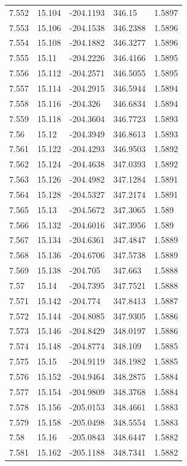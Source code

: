 \begin{tabular}{lllll}
7.552 & 15.104 & -204.1193 & 346.15 & 1.5897 \\
7.553 & 15.106 & -204.1538 & 346.2388 & 1.5896 \\
7.554 & 15.108 & -204.1882 & 346.3277 & 1.5896 \\
7.555 & 15.11 & -204.2226 & 346.4166 & 1.5895 \\
7.556 & 15.112 & -204.2571 & 346.5055 & 1.5895 \\
7.557 & 15.114 & -204.2915 & 346.5944 & 1.5894 \\
7.558 & 15.116 & -204.326 & 346.6834 & 1.5894 \\
7.559 & 15.118 & -204.3604 & 346.7723 & 1.5893 \\
7.56 & 15.12 & -204.3949 & 346.8613 & 1.5893 \\
7.561 & 15.122 & -204.4293 & 346.9503 & 1.5892 \\
7.562 & 15.124 & -204.4638 & 347.0393 & 1.5892 \\
7.563 & 15.126 & -204.4982 & 347.1284 & 1.5891 \\
7.564 & 15.128 & -204.5327 & 347.2174 & 1.5891 \\
7.565 & 15.13 & -204.5672 & 347.3065 & 1.589 \\
7.566 & 15.132 & -204.6016 & 347.3956 & 1.589 \\
7.567 & 15.134 & -204.6361 & 347.4847 & 1.5889 \\
7.568 & 15.136 & -204.6706 & 347.5738 & 1.5889 \\
7.569 & 15.138 & -204.705 & 347.663 & 1.5888 \\
7.57 & 15.14 & -204.7395 & 347.7521 & 1.5888 \\
7.571 & 15.142 & -204.774 & 347.8413 & 1.5887 \\
7.572 & 15.144 & -204.8085 & 347.9305 & 1.5886 \\
7.573 & 15.146 & -204.8429 & 348.0197 & 1.5886 \\
7.574 & 15.148 & -204.8774 & 348.109 & 1.5885 \\
7.575 & 15.15 & -204.9119 & 348.1982 & 1.5885 \\
7.576 & 15.152 & -204.9464 & 348.2875 & 1.5884 \\
7.577 & 15.154 & -204.9809 & 348.3768 & 1.5884 \\
7.578 & 15.156 & -205.0153 & 348.4661 & 1.5883 \\
7.579 & 15.158 & -205.0498 & 348.5554 & 1.5883 \\
7.58 & 15.16 & -205.0843 & 348.6447 & 1.5882 \\
7.581 & 15.162 & -205.1188 & 348.7341 & 1.5882 \\

\end{tabular}
